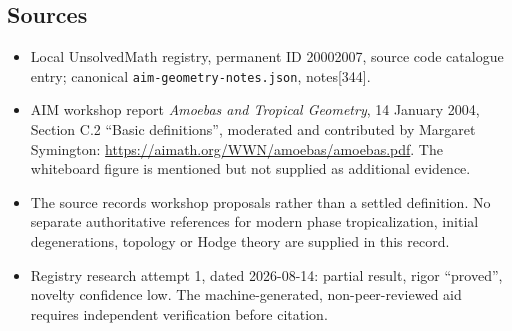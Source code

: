 \documentclass[11pt]{article}
\begin{document}
\subsection{Sources}
\begin{itemize}
\item Local UnsolvedMath registry, permanent ID 20002007, source code catalogue entry; canonical \texttt{aim-geometry-notes.json}, notes[344].
\item AIM workshop report \emph{Amoebas and Tropical Geometry}, 14 January 2004, Section C.2 ``Basic definitions'', moderated and contributed by Margaret Symington: \url{https://aimath.org/WWN/amoebas/amoebas.pdf}. The whiteboard figure is mentioned but not supplied as additional evidence.
\item The source records workshop proposals rather than a settled definition. No separate authoritative references for modern phase tropicalization, initial degenerations, topology or Hodge theory are supplied in this record.
\item Registry research attempt 1, dated 2026-08-14: partial result, rigor ``proved'', novelty confidence low. The machine-generated, non-peer-reviewed aid requires independent verification before citation.
\end{itemize}
\end{document}
